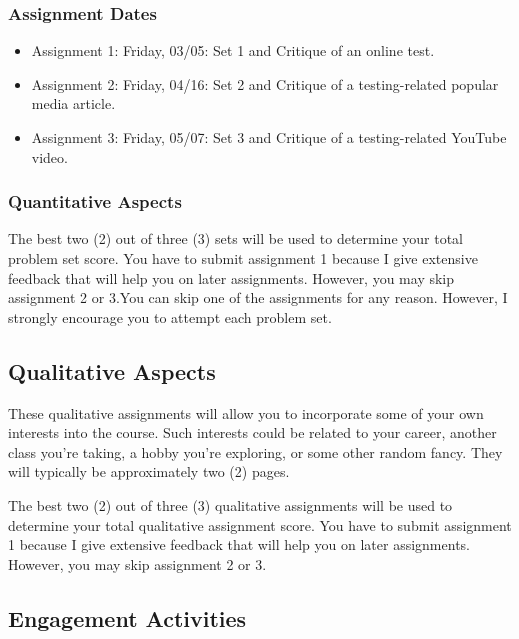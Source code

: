 \documentclass[11pt,]{article}
\begin{document}
\hypertarget{assignment-dates}{%
\subsubsection{Assignment Dates}\label{assignment-dates}}

\begin{itemize}
\item
  Assignment 1: Friday, 03/05: Set 1 and Critique of an online test.
\item
  Assignment 2: Friday, 04/16: Set 2 and Critique of a testing-related
  popular media article.
\item
  Assignment 3: Friday, 05/07: Set 3 and Critique of a testing-related
  YouTube video.
\end{itemize}

\hypertarget{quantitative-aspects}{%
\subsubsection{Quantitative Aspects}\label{quantitative-aspects}}

The best two (2) out of three (3) sets will be used to determine your
total problem set score. You have to submit assignment 1 because I give
extensive feedback that will help you on later assignments. However, you
may skip assignment 2 or 3.You can skip one of the assignments for any
reason. However, I strongly encourage you to attempt each problem set.

\hypertarget{qualitative-aspects}{%
\subsection{Qualitative Aspects}\label{qualitative-aspects}}

These qualitative assignments will allow you to incorporate some of your
own interests into the course. Such interests could be related to your
career, another class you're taking, a hobby you're exploring, or some
other random fancy. They will typically be approximately two (2) pages.

The best two (2) out of three (3) qualitative assignments will be used
to determine your total qualitative assignment score. You have to submit
assignment 1 because I give extensive feedback that will help you on
later assignments. However, you may skip assignment 2 or 3.

\hypertarget{engagement-activities}{%
\subsection{Engagement Activities}\label{engagement-activities}}
\end{document}

